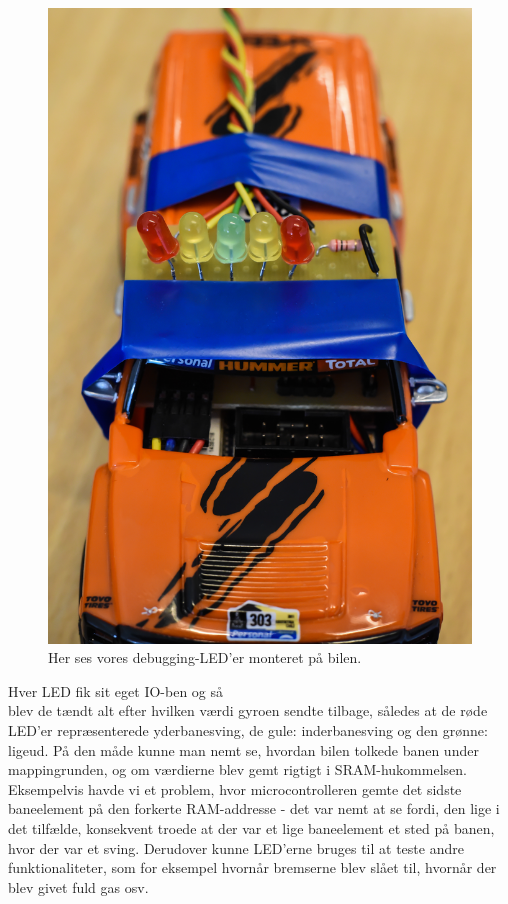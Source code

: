 \begin{figure}
	\begin{minipage}{.3\textwidth}
	\centering
		\includegraphics[scale=0.04]{Billeder/Debug-lys.JPG}
	\caption{Her ses vores debugging-LED'er monteret på bilen.}
	\label{fig:Udrykning}
	\end{minipage}
\end{figure}

Hver LED fik sit eget IO-ben og så \\ blev de tændt alt efter hvilken værdi gyroen sendte tilbage, således at de røde LED'er repræsenterede yderbanesving, de gule: inderbanesving og den grønne: ligeud. På den måde kunne man nemt se, hvordan bilen tolkede banen under mappingrunden, og om værdierne blev gemt rigtigt i SRAM-hukommelsen.	Eksempelvis havde vi et problem, hvor microcontrolleren gemte det sidste baneelement på den forkerte RAM-addresse - det var nemt at se fordi, den lige i det tilfælde, konsekvent troede at der var et lige baneelement et sted på banen, hvor der var et sving. Derudover kunne LED'erne bruges til at teste andre funktionaliteter, som for eksempel hvornår bremserne blev slået til, hvornår der blev givet fuld gas osv.